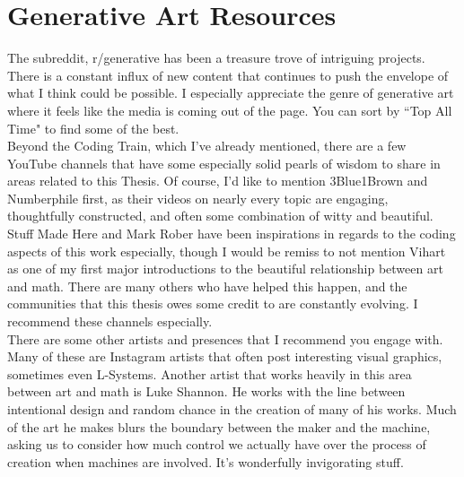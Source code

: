 \documentclass[12pt,twoside]{reedthesis}
\begin{document}
      \chapter{Generative Art Resources}
      \label{Resources}
      The subreddit, r/generative has been a treasure trove of intriguing projects. There is a constant influx of new content that continues to push the envelope of what I think could be possible. I especially appreciate the genre of generative art where it feels like the media is coming out of the page. You can sort by ``Top All Time" to find some of the best.\\
      
      Beyond the Coding Train, which I've already mentioned, there are a few YouTube channels that have some especially solid pearls of wisdom to share in areas related to this Thesis. Of course, I'd like to mention 3Blue1Brown and Numberphile first, as their videos on nearly every topic are engaging, thoughtfully constructed, and often some combination of witty and beautiful. Stuff Made Here and Mark Rober have been inspirations in regards to the coding aspects of this work especially, though I would be remiss to not mention Vihart as one of my first major introductions to the beautiful relationship between art and math. There are many others who have helped this happen, and the communities that this thesis owes some credit to are constantly evolving. I recommend these channels especially.\\
      
      There are some other artists and presences that I recommend you engage with. Many of these are Instagram artists that often post interesting visual graphics, sometimes even L-Systems. Another artist that works heavily in this area between art and math is Luke Shannon. He works with the line between intentional design and random chance in the creation of many of his works. Much of the art he makes blurs the boundary between the maker and the machine, asking us to consider how much control we actually have over the process of creation when machines are involved. It's wonderfully invigorating stuff.

\backmatter 


\nocite{*}
 
\end{document}

